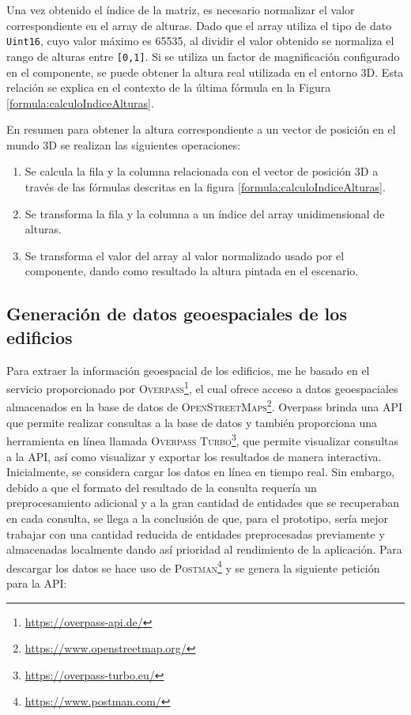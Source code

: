 \documentclass[a4paper, 11pt]{book}
\begin{document}
Una vez obtenido el índice de la matriz, es necesario normalizar el valor correspondiente en el array de alturas. Dado que el array utiliza el tipo de dato \texttt{Uint16}, cuyo valor máximo es 65535, al dividir el valor obtenido se normaliza el rango de alturas entre \texttt{[0,1]}. Si se utiliza un factor de magnificación configurado en el componente, se puede obtener la altura real utilizada en el entorno 3D. Esta relación se explica en el contexto de la última fórmula en la Figura \ref{formula:calculoIndiceAlturas}.

En resumen para obtener la altura correspondiente a un vector de posición en el mundo 3D se realizan las siguientes operaciones:
\begin{enumerate}
	\item Se calcula la fila y la columna relacionada con el vector de posición 3D a través de las fórmulas descritas en la figura \ref{formula:calculoIndiceAlturas}.
	\item Se transforma la fila y la columna a un índice del array unidimensional de alturas.
	\item Se transforma el valor del array al valor normalizado usado por el componente, dando como resultado la altura pintada en el escenario.
\end{enumerate}

\subsection{Generación de datos geoespaciales de los edificios}
\label{subsec:buildingData}
Para extraer la información \gls{geoespacial} de los edificios, me he basado en el servicio proporcionado por \textsc{Overpass}\footnote{\url{https://overpass-api.de/}}, el cual ofrece acceso a datos geoespaciales almacenados en la base de datos de \textsc{OpenStreetMaps}\footnote{\url{https://www.openstreetmap.org/}}. 
Overpass brinda una \textsc{API} que permite realizar consultas a la base de datos y también proporciona una herramienta en línea llamada \textsc{Overpass Turbo}\footnote{\url{https://overpass-turbo.eu/}}, que permite visualizar consultas a la \textsc{API}, así como visualizar y exportar los resultados de manera interactiva.
Inicialmente, se considera cargar los datos en línea en tiempo real. Sin embargo, debido a que el formato del resultado de la consulta requería un preprocesamiento adicional y a la gran cantidad de entidades que se recuperaban en cada consulta, se llega a la conclusión de que, para el prototipo, sería mejor trabajar con una cantidad reducida de entidades preprocesadas previamente y almacenadas localmente dando así prioridad al rendimiento de la aplicación.
Para descargar los datos se hace uso de \textsc{Postman}\footnote{\url{https://www.postman.com/}} y se genera la siguiente petición para la \textsc{API}:
\end{document}
